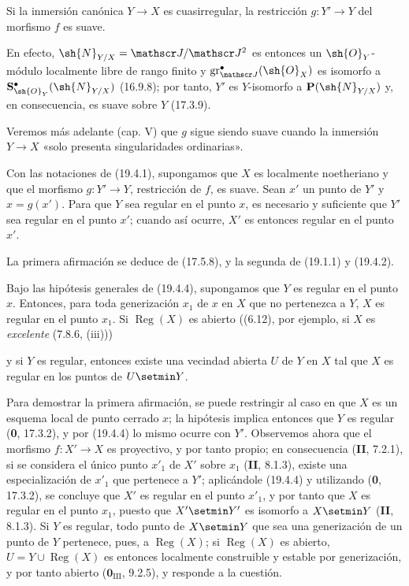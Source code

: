 \begin{corollary}[19.4.3]
\label{IV.19.4.3}
Si la inmersión canónica $Y\to X$ es cuasirregular, la restricción $g:Y'\to Y$ del morfismo $f$ es suave.
\end{corollary}

En efecto, $\sh{N}_{Y/X}=\mathscr J/\mathscr J^2$ es entonces un $\sh{O}_Y$-módulo localmente libre de rango finito y $\operatorname{gr}_{\mathscr J}^\bullet(\sh{O}_X)$ es isomorfo a $\mathbf S_{\sh{O}_Y}^\bullet(\sh{N}_{Y/X})$ (16.9.8); por tanto, $Y'$ es $Y$-isomorfo a $\mathbf P(\sh{N}_{Y/X})$ y, en consecuencia, es suave sobre $Y$ (17.3.9).

Veremos más adelante (cap. V) que $g$ sigue siendo suave cuando la inmersión $Y\to X$ «solo presenta singularidades ordinarias».

\begin{proposition}[19.4.4]
\label{IV.19.4.4}
Con las notaciones de \textup{(19.4.1)}, supongamos que $X$ es localmente noetheriano y que el morfismo $g:Y'\to Y$, restricción de $f$, es suave. Sean $x'$ un punto de $Y'$ y $x=g(x')$. Para que $Y$ sea regular en el punto $x$, es necesario y suficiente que $Y'$ sea regular en el punto $x'$; cuando así ocurre, $X'$ es entonces regular en el punto $x'$.
\end{proposition}

La primera afirmación se deduce de (17.5.8), y la segunda de (19.1.1) y (19.4.2).

\begin{corollary}[19.4.5]
\label{IV.19.4.5}
Bajo las hipótesis generales de \textup{(19.4.4)}, supongamos que $Y$ es regular en el punto $x$. Entonces, para toda generización $x_1$ de $x$ en $X$ que no pertenezca a $Y$, $X$ es regular en el punto $x_1$. Si $\operatorname{Reg}(X)$ es abierto \textup{((6.12), por ejemplo, si $X$ es \emph{excelente} (7.8.6, (iii)))}


y si $Y$ es regular, entonces existe una vecindad abierta $U$ de $Y$ en $X$ tal que $X$ es regular en los puntos de $U\setmin Y$.
\end{corollary}

Para demostrar la primera afirmación, se puede restringir al caso en que $X$ es un esquema local de punto cerrado $x$; la hipótesis implica entonces que $Y$ es regular (\textbf{0}, 17.3.2), y por (19.4.4) lo mismo ocurre con $Y'$. Observemos ahora que el morfismo $f:X'\to X$ es proyectivo, y por tanto propio; en consecuencia (\textbf{II}, 7.2.1), si se considera el único punto $x'_1$ de $X'$ sobre $x_1$ (\textbf{II}, 8.1.3), existe una especialización de $x'_1$ que pertenece a $Y'$; aplicándole (19.4.4) y utilizando (\textbf{0}, 17.3.2), se concluye que $X'$ es regular en el punto $x'_1$, y por tanto que $X$ es regular en el punto $x_1$, puesto que $X'\setmin Y'$ es isomorfo a $X\setmin Y$ (\textbf{II}, 8.1.3). Si $Y$ es regular, todo punto de $X\setmin Y$ que sea una generización de un punto de $Y$ pertenece, pues, a $\operatorname{Reg}(X)$; si $\operatorname{Reg}(X)$ es abierto, $U=Y\cup\operatorname{Reg}(X)$ es entonces localmente construible y estable por generización, y por tanto abierto ($\mathbf{0}_{\mathrm{III}}$, 9.2.5), y responde a la cuestión.

